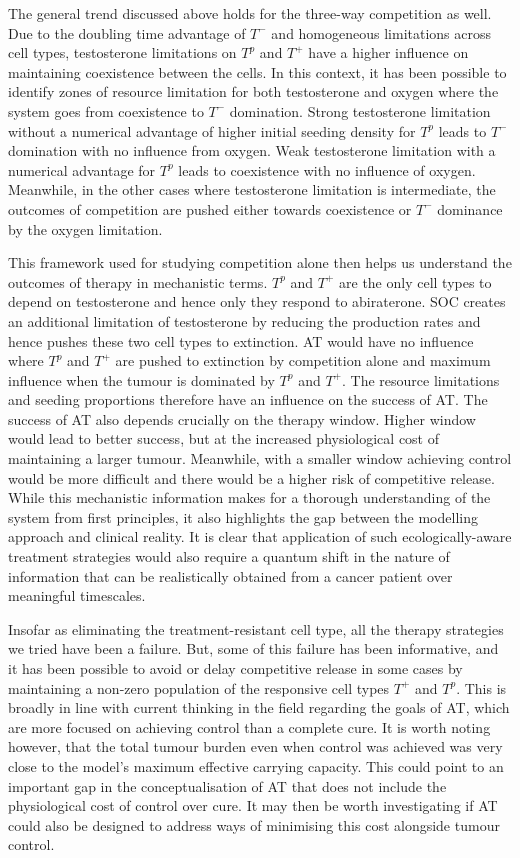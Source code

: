 The general trend discussed above holds for the three-way competition as well. Due to the doubling time advantage of $T^-$ and homogeneous limitations across cell types, testosterone limitations on $T^p$ and $T^+$ have a higher influence on maintaining coexistence between the cells. In this context, it has been possible to identify zones of resource limitation for both testosterone and oxygen where the system goes from coexistence to $T^-$ domination. Strong testosterone limitation without a numerical advantage of higher initial seeding density for $T^p$ leads to $T^-$ domination with no influence from oxygen. Weak testosterone limitation with a numerical advantage for $T^p$ leads to coexistence with no influence of oxygen. Meanwhile, in the other cases where testosterone limitation is intermediate, the outcomes of competition are pushed either towards coexistence or $T^-$ dominance by the oxygen limitation.

This framework used for studying competition alone then helps us understand the outcomes of therapy in mechanistic terms. $T^p$ and $T^+$ are the only cell types to depend on testosterone and hence only they respond to abiraterone. SOC creates an additional limitation of testosterone by reducing the production rates and hence pushes these two cell types to extinction. AT would have no influence where $T^p$ and $T^+$ are pushed to extinction by competition alone and maximum influence when the tumour is dominated by $T^p$ and $T^+$. The resource limitations and seeding proportions therefore have an influence on the success of AT. The success of AT also depends crucially on the therapy window. Higher window would lead to better success, but at the increased physiological cost of maintaining a larger tumour. Meanwhile, with a smaller window achieving control would be more difficult and there would be a higher risk of competitive release. While this mechanistic information makes for a thorough understanding of the system from first principles, it also highlights the gap between the modelling approach and clinical reality. It is clear that application of such ecologically-aware treatment strategies would also require a quantum shift in the nature of information that can be realistically obtained from a cancer patient over meaningful timescales.

Insofar as eliminating the treatment-resistant cell type, all the therapy strategies we tried have been a failure. But, some of this failure has been informative, and it has been possible to avoid or delay competitive release in some cases by maintaining a non-zero population of the responsive cell types $T^+$ and $T^p$. This is broadly in line with current thinking in the field regarding the goals of AT, which are more focused on achieving control than a complete cure. It is worth noting however, that the total tumour burden even when control was achieved was very close to the model’s maximum effective carrying capacity. This could point to an important gap in the conceptualisation of AT that does not include the physiological cost of control over cure. It may then be worth investigating if AT could also be designed to address ways of minimising this cost alongside tumour control.

